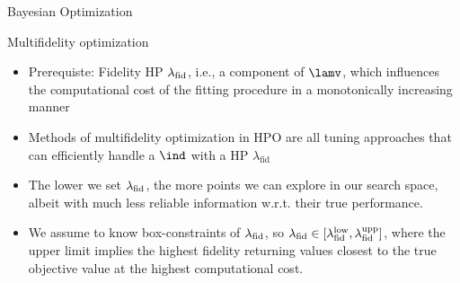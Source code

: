 \begin{vbframe}{Bayesian Optimization}
\end{vbframe}



\begin{vbframe}{Multifidelity optimization}
\begin{itemize}
\item Prerequiste: Fidelity  HP $\lambda_{\text{fid}}$, i.e.,  a  component  of $\lamv$,  which  influences  the computational  cost  of  the  fitting  procedure  in  a  monotonically  increasing  manner
\item Methods of multifidelity optimization in HPO are all tuning  approaches  that  can  efficiently handle  a $\ind$ with  a  HP $\lambda_{\text{fid}}$
\item The  lower  we  set $\lambda_{\text{fid}}$,  the more points we can explore in our search space, albeit with much less reliable information w.r.t. their true performance.
\item We  assume  to  know  box-constraints  of $\lambda_{\text{fid}}$,  so $\lambda_{\text{fid}} \in [\lambda_{\text{fid}}^{\textrm{low}}, \lambda_{\text{fid}}^{\textrm{upp}}]$,  where  the  upper  limit  implies  the  highest  fidelity  returning  values closest to the true objective value at the highest computational cost. 
\end{itemize}
\end{vbframe}

